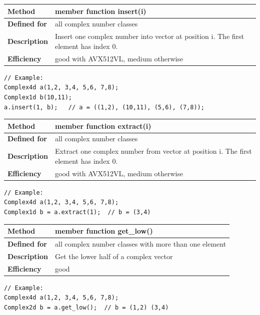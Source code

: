 \documentclass[11pt,a4paper,oneside,openright]{report}
\newcommand{\vspacesmall}{\vspace{3mm}}
\newcommand{\vspacebig}{\vspace{6mm}}
\begin{document}
\begin{tabular}{|p{25mm}|p{100mm}|}
\hline
\bfseries Method & member function insert(i) \\ \hline
\bfseries Defined for & all complex number classes \\ \hline
\bfseries Description & Insert one complex number into vector at position i. \newline
The first element has index 0. \\ \hline
\bfseries Efficiency & good with AVX512VL, medium otherwise \\ \hline
\end{tabular}
\vspacesmall

\begin{lstlisting}[frame=none]
// Example:
Complex4d a(1,2, 3,4, 5,6, 7,8);
Complex1d b(10,11);
a.insert(1, b);   // a = ((1,2), (10,11), (5,6), (7,8));
\end{lstlisting}
\vspacebig


\begin{tabular}{|p{25mm}|p{100mm}|}
\hline
\bfseries Method & member function extract(i) \\ \hline
\bfseries Defined for & all complex number classes \\ \hline
\bfseries Description & Extract one complex number from vector at position i. \newline
The first element has index 0. \\ \hline
\bfseries Efficiency & good with AVX512VL, medium otherwise \\ \hline
\end{tabular}
\vspacesmall

\begin{lstlisting}[frame=none]
// Example:
Complex4d a(1,2, 3,4, 5,6, 7,8);
Complex1d b = a.extract(1);  // b = (3,4)
\end{lstlisting}
\vspacebig

\begin{tabular}{|p{25mm}|p{100mm}|}
\hline
\bfseries Method & member function get\_low() \\ \hline
\bfseries Defined for & all complex number classes with more than one element
 \\ \hline
\bfseries Description & Get the lower half of a complex vector \\ \hline
\bfseries Efficiency & good \\ \hline
\end{tabular}
\vspacesmall

\begin{lstlisting}[frame=none]
// Example:
Complex4d a(1,2, 3,4, 5,6, 7,8);
Complex2d b = a.get_low();  // b = (1,2) (3,4)
\end{lstlisting}
\vspacebig
\end{document}
